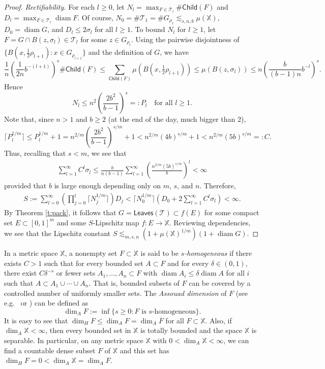 \documentclass[12pt]{amsart}
\theoremstyle{definition}
\theoremstyle{remark}
\newcommand{\XX}{\mathbb{X}}
\newcommand{\diam}{\mathop\mathrm{diam}\nolimits}
\newcommand{\leaves}{\mathsf{Leaves}}
\newcommand{\Child}{\mathsf{Child}}
\numberwithin{figure}{section}
\numberwithin{equation}{section}
\begin{document}
\begin{proof}
\emph{Rectifiability.} For each $l\geq 0$, let $N_l=\max_{F\in\mathcal{T}_l}\#\Child(F)$ and $D_l=\max_{F\in\mathcal{T}_l}\diam F$. Of course, $N_0=\#\mathcal{T}_1=\#G_{\rho_1}\lesssim_{s,n,b} \mu(\XX)$, $D_0=\diam G$, and $D_l\leq 2\sigma_l$ for all $l\geq 1$. To bound $N_l$ for $l\geq 1$, let $F=G\cap B(z,\sigma_l)\in \mathcal{T}_l$ for some $z\in G_{\rho_l}$. Using the pairwise disjointness of $\{B(x,\frac{1}{2}\rho_{l+1}):x\in G_{\rho_{l+1}}\}$ and the definition of $G$, we have \begin{equation*} \frac{1}{n}\left(\frac{1}{2n} b^{-(l+1)}\right)^s \#\Child(F) \leq \sum_{\Child(F)}\mu(B(x,\tfrac{1}{2}\rho_{l+1}))\leq \mu(B(z,\sigma_l))\leq n\left(\frac{b}{(b-1)n}b^{-l}\right)^s.\end{equation*} Hence \begin{equation*}N_l \leq n^2\left(\frac{2b^2}{b-1}\right)^s=:P_l\quad\text{for all }l\geq 1.\end{equation*} Note that, since $n> 1$ and $b\geq 2$ (at the end of the day, much bigger than 2), $$\lceil P_l^{1/m}\rceil \leq P_l^{1/m}+1=n^{2/m}\left(\frac{2b^2}{b-1}\right)^{s/m}+1<n^{2/m}(4b)^{s/m}+1<n^{2/m}(5b)^{s/m}=:C.$$ Thus, recalling that $s<m$, we see that \begin{align*}\sum_{l=1}^\infty C^l\sigma_l \leq \frac{b}{n(b-1)}\sum_{l=1}^\infty \left(\frac{n^{2/m}(5b)^{s/m}}{b}\right)^l<\infty \end{align*} provided that $b$ is large enough depending only on $m$, $s$, and $n$. Therefore, \begin{align*}
S:=\sum_{l=0}^\infty \left(\prod_{j=0}^l \lceil N_j^{1/m}\rceil\right)D_j < \lceil N_0^{1/m}\rceil\left(D_0+ 2\sum_{l=1}^\infty C^l\sigma_l\right)<\infty.\end{align*} By Theorem \ref{t:pack}, it follows that $G=\leaves(\mathcal{T})\subset f(E)$ for some compact set $E\subset[0,1]^m$ and some $S$-Lipschitz map $f:E\rightarrow\XX$. Reviewing dependencies, we see that the Lipschitz constant $S\lesssim_{m,s,n}(1+\mu(\XX)^{1/m})(1+\diam G)$.
\end{proof}

In a metric space $\XX$, a nonempty set $F\subset\XX$ is said to be \emph{$s$-homogeneous} if there exists $C>1$ such that for every bounded set $A\subset F$ and for every $\delta\in(0,1)$, there exist $C\delta^{-s}$ or fewer sets $A_1,\dots,A_n\subset F$ with $\diam A_i\leq \delta\diam A$ for all $i$ such that $A\subset A_1\cup\cdots\cup A_n$. That is, bounded subsets of $F$ can be covered by a controlled number of uniformly smaller sets. The \emph{Assouad dimension} of $F$ (see e.g.~\cite{Luukk} or \cite{Fraser-book}) can be defined as \begin{equation} \dim_A F:=\inf\{s\geq 0:\text{$F$ is $s$-homogeneous}\}.\end{equation} It is easy to see that $\dim_H F\leq \dim_A F=\dim_A{\overline{F}}$ for all $F\subset\XX$. Also, if $\dim_A \XX<\infty$, then every bounded set in $\XX$ is totally bounded and the space $\XX$ is separable. In particular, on any metric space $\XX$ with $0<\dim_A \XX<\infty$, we can find a countable dense subset $F$ of $\XX$ and this set has $\dim_H F=0< \dim_A\XX=\dim_A F$.
\end{document}
